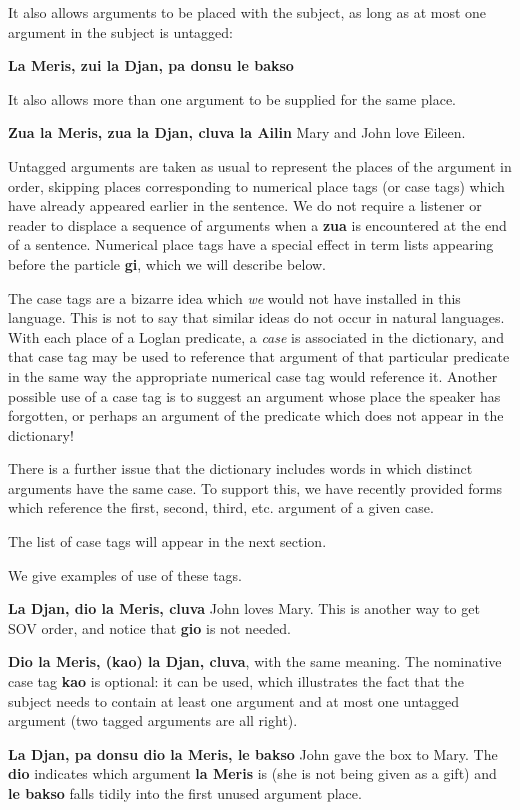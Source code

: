 \documentclass[12pt]{book}
\begin{document}
{It also allows arguments to be placed with the subject, as long as at most one argument in the subject is untagged:

{\bf La Meris, zui la Djan, pa donsu le bakso}

It also allows more than one argument to be supplied for the same place.

{\bf Zua la Meris, zua la Djan, cluva la Ailin}  Mary and John love Eileen.

Untagged arguments are taken as usual to represent the places of the argument in order, skipping places corresponding to numerical place tags (or case tags) which have already appeared earlier in the sentence.  We do not require a listener or reader to displace a sequence of arguments when a {\bf zua} is encountered at the end of a sentence.  Numerical place tags have a special effect in term lists appearing before the particle {\bf gi}, which we will describe below.

The case tags are a bizarre idea which {\em we\/} would not have installed in this language.  This is not to say that similar ideas do not occur in natural languages.  With each place of a Loglan predicate, a {\em case\/} is associated in the dictionary, and that case tag may be used to reference that argument of that particular predicate in the same way the appropriate numerical case tag would reference it.  Another possible use of a case tag is to suggest an argument whose place the speaker has forgotten, or perhaps an argument of the predicate which does not appear in the dictionary!

There is a further issue that the dictionary includes words in which distinct arguments have the same case.  To support this, we have recently provided forms which reference the first, second, third, etc. argument of a given case.

The list of case tags will appear in the next section.

We give examples of use of these tags.

{\bf La Djan, dio la Meris, cluva}  John loves Mary.  This is another way to get SOV order, and notice that {\bf gio} is not needed.

{\bf Dio la Meris, (kao) la Djan, cluva}, with the same meaning.  The nominative case tag {\bf kao} is optional:  it can be used, which illustrates the fact that the subject needs to contain at least one argument
and at most one untagged argument (two tagged arguments are all right).

{\bf La Djan, pa donsu dio la Meris, le bakso}  John gave the box to Mary.  The {\bf dio} indicates which argument {\bf la Meris} is (she is not being given as a gift) and {\bf le bakso} falls tidily into the first unused argument place.

}
\end{document}
